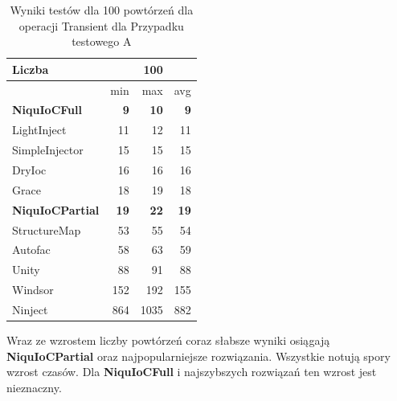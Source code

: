 \documentclass[12pt]{article}
\begin{document}
\begin{table}[H]
\captionsetup{belowskip=0pt,aboveskip=0pt}
\begin{center}
\begin{small}
	\begin{tabular}{ | l | r r r | }
    		\hline
Liczba & & 100 & \\ \hline
 & min & max & avg \\ \hline
\textbf{NiquIoCFull} & \textbf{9} & \textbf{10} & \textbf{9} \\ \hline
LightInject & 11 & 12 & 11 \\ \hline
SimpleInjector & 15 & 15 & 15 \\ \hline
DryIoc & 16 & 16 & 16 \\ \hline
Grace & 18 & 19 & 18 \\ \hline
\textbf{NiquIoCPartial} & \textbf{19} & \textbf{22} & \textbf{19} \\ \hline
StructureMap & 53 & 55 & 54 \\ \hline
Autofac & 58 & 63 & 59 \\ \hline
Unity & 88 & 91 & 88 \\ \hline
Windsor & 152 & 192 & 155 \\ \hline
Ninject & 864 & 1035 & 882 \\ \hline
  	\end{tabular}
\end{small}
\end{center}
\caption{Wyniki testów dla 100 powtórzeń dla operacji Transient dla Przypadku testowego A}
\label{TestCaseA_Transient100}
\end{table}
Wraz ze wzrostem liczby powtórzeń coraz słabsze wyniki osiągają \textbf{NiquIoCPartial} oraz najpopularniejsze rozwiązania. Wszystkie notują spory wzrost czasów. Dla \textbf{NiquIoCFull} i najszybszych rozwiązań ten wzrost jest nieznaczny.
\\ \\
\end{document}
